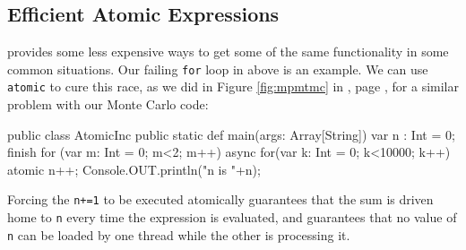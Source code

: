 \subsection{Efficient Atomic Expressions}\label{ssec:efficient}
\Xten{} provides some less expensive ways to get some of the same functionality
in some common situations.  Our failing {\tt for} loop in  
above is an example.  We can use {\tt atomic} to cure this race, as we did
in Figure \ref{fig:mpmtmc} in , page
\pageref{fig:mpmtmc}, for a similar problem with our Monte Carlo code:  
\begin{xtennum}[]
public class AtomicInc {
	public static def main(args: Array[String]) {
	   var n : Int = 0;
	   finish for (var m: Int = 0; m<2; m++) {
	      async for(var k: Int = 0; k<10000; k++) atomic n++; 
	   }
	   Console.OUT.println("n is "+n);
	}
}
\end{xtennum}

Forcing the {\tt n+=1} to be executed atomically guarantees that the sum is driven
home to {\tt n} every time the expression is evaluated, and guarantees that no
value of {\tt n} can be loaded by one thread while the other is processing it.

